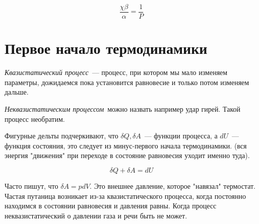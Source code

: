 \documentclass[../main.tex]{subfiles}
\begin{document}
    \begin{equation}
        \frac{\chi \beta}{\alpha} = \frac{1}{P}
    \end{equation}

    \section{Первое начало термодинамики} 

    \emph{Квазистатический процесс}~--- процесс, при котором мы мало изменяем параметры, дожидаемся пока установится равновесие и только потом изменяем дальше.

    \emph{Неквазистатическим процессом}~можно назвать например удар гирей. Такой процесс необратим.

    \begin{note}
        Фигурные дельты подчеркивают, что $\delta Q, \delta A$~--- функции процесса, а $dU$~--- функция состояния, это следует из минус-первого начала термодинамики. (вся энергия "движения" при переходе в состояние равновесия уходит именно туда). 
    \end{note}

    \begin{equation}
        \delta Q + \delta A = dU
    \end{equation}

    \begin{note}
        Часто пишут, что $\delta A = p dV$. Это внешнее давление, которое "навязал" термостат. Частая путаница возникает из-за квазистатического процесса, когда постоянно находимся в состоянии равновесия и давления равны. Когда процесс неквазистатический о давлении газа и речи быть не может.
    \end{note}
\end{document}
